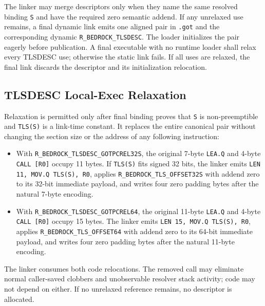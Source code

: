 \documentclass[10pt,twoside]{article}
\begin{document}
The linker may merge descriptors only when they name the same resolved binding
\texttt{S} and have the required zero semantic addend. If any unrelaxed use
remains, a final dynamic link emits one aligned pair in \texttt{.got} and the
corresponding dynamic \texttt{R\_BEDROCK\_TLSDESC}. The loader initializes the
pair eagerly before publication. A final executable with no runtime loader
shall relax every TLSDESC use; otherwise the static link fails. If all uses are
relaxed, the final link discards the descriptor and its initialization
relocation.

\subsection{TLSDESC Local-Exec Relaxation}
Relaxation is permitted only after final binding proves that \texttt{S} is
non-preemptible and \texttt{TLS(S)} is a link-time constant. It replaces the
entire canonical pair without changing the section size or the address of any
following instruction:
\begin{itemize}\raggedright
\item With \texttt{R\_BEDROCK\_TLSDESC\_GOTPCREL32S}, the original
      7-byte \texttt{LEA.Q} and 4-byte \texttt{CALL [R0]} occupy 11 bytes. If
      \texttt{TLS(S)} fits signed 32 bits, the linker emits
      \texttt{LEN 11, MOV.Q TLS(S), R0}, applies
      \texttt{R\_BEDROCK\_TLS\_OFFSET32S} with addend zero to its 32-bit
      immediate payload, and writes four zero padding bytes after the natural
      7-byte encoding.
\item With \texttt{R\_BEDROCK\_TLSDESC\_GOTPCREL64}, the original
      11-byte \texttt{LEA.Q} and 4-byte \texttt{CALL [R0]} occupy 15 bytes. The
      linker emits \texttt{LEN 15, MOV.Q TLS(S), R0}, applies
      \texttt{R\_BEDROCK\_TLS\_OFFSET64} with addend zero to its 64-bit
      immediate payload, and writes four zero padding bytes after the natural
      11-byte encoding.
\end{itemize}
The linker consumes both code relocations. The removed call may eliminate
normal caller-saved clobbers and unobservable resolver stack activity; code may
not depend on either. If no unrelaxed reference remains, no descriptor is
allocated.

\clearpage
\end{document}

